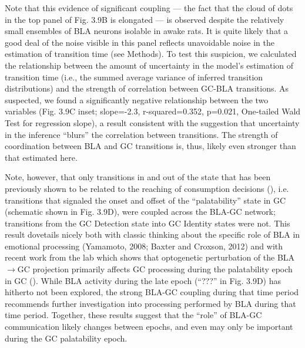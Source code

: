 \begin{refsection}
Note that this evidence of significant coupling --- the fact that the cloud of dots in the top panel of Fig. 3.9B is elongated --- is observed despite the relatively small ensembles of BLA neurons isolable in awake rats. It is quite likely that a good deal of the noise visible in this panel reflects unavoidable noise in the estimation of transition time (see Methods). To test this suspicion, we calculated the relationship between the amount of uncertainty in the model’s estimation of transition time (i.e., the summed average variance of inferred transition distributions) and the strength of correlation between GC-BLA transitions. As suspected, we found a significantly negative relationship between the two variables (Fig. 3.9C inset; slope=-2.3, r-squared=0.352, p=0.021, One-tailed Wald Test for regression slope), a result consistent with the suggestion that uncertainty in the inference “blurs” the correlation between transitions. The strength of coordination between BLA and GC transitions is, thus, likely even stronger than that estimated here.

Note, however, that only transitions in and out of the state that has been previously shown to be related to the reaching of consumption decisions (\cite{sadacca2016a}), i.e. transitions that signaled the onset and offset of the “palatability” state in GC (schematic shown in Fig. 3.9D), were coupled across the BLA-GC network; transitions from the GC Detection state into GC Identity states were not. This result dovetails nicely both with classic thinking about the specific role of BLA in emotional processing (Yamamoto, 2008; Baxter and Croxson, 2012) and with recent work from the lab which shows that optogenetic perturbation of the BLA$\rightarrow$GC projection primarily affects GC processing during the palatability epoch in GC (\cite{lin2021a}). While BLA activity during the late epoch (“???” in Fig. 3.9D) has hitherto not been explored, the strong BLA-GC coupling during that time period recommends further investigation into processing performed by BLA during that time period. Together, these results suggest that the “role” of BLA-GC communication likely changes between epochs, and even may only be important during the GC palatability epoch.


\end{refsection}
